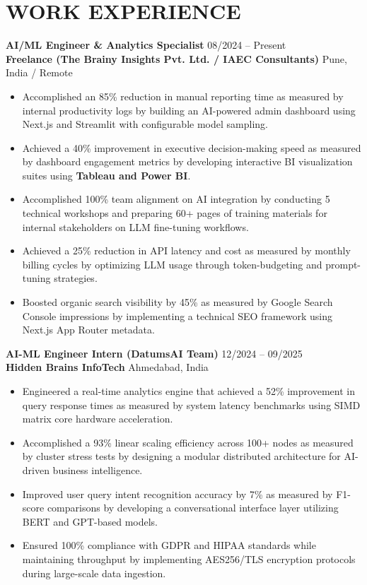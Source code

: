 \documentclass[10pt, a4paper]{article}
\begin{document}
\section{WORK EXPERIENCE}

\textbf{AI/ML Engineer \& Analytics Specialist} \hfill 08/2024 – Present \\
\textbf{Freelance (The Brainy Insights Pvt. Ltd. / IAEC Consultants)} \hfill Pune, India / Remote
\begin{itemize}
    \item Accomplished an 85\% reduction in manual reporting time as measured by internal productivity logs by building an AI-powered admin dashboard using Next.js and Streamlit with configurable model sampling.
    \item Achieved a 40\% improvement in executive decision-making speed as measured by dashboard engagement metrics by developing interactive BI visualization suites using \textbf{Tableau and Power BI}.
    \item Accomplished 100\% team alignment on AI integration by conducting 5 technical workshops and preparing 60+ pages of training materials for internal stakeholders on LLM fine-tuning workflows.
    \item Achieved a 25\% reduction in API latency and cost as measured by monthly billing cycles by optimizing LLM usage through token-budgeting and prompt-tuning strategies.
    \item Boosted organic search visibility by 45\% as measured by Google Search Console impressions by implementing a technical SEO framework using Next.js App Router metadata.
\end{itemize}

\vspace{8pt}
\textbf{AI-ML Engineer Intern (DatumsAI Team)} \hfill 12/2024 – 09/2025 \\
\textbf{Hidden Brains InfoTech} \hfill Ahmedabad, India
\begin{itemize}
    \item Engineered a real-time analytics engine that achieved a 52\% improvement in query response times as measured by system latency benchmarks using SIMD matrix core hardware acceleration.
    \item Accomplished a 93\% linear scaling efficiency across 100+ nodes as measured by cluster stress tests by designing a modular distributed architecture for AI-driven business intelligence.
    \item Improved user query intent recognition accuracy by 7\% as measured by F1-score comparisons by developing a conversational interface layer utilizing BERT and GPT-based models.
    \item Ensured 100\% compliance with GDPR and HIPAA standards while maintaining throughput by implementing AES256/TLS encryption protocols during large-scale data ingestion.
\end{itemize}
\end{document}
